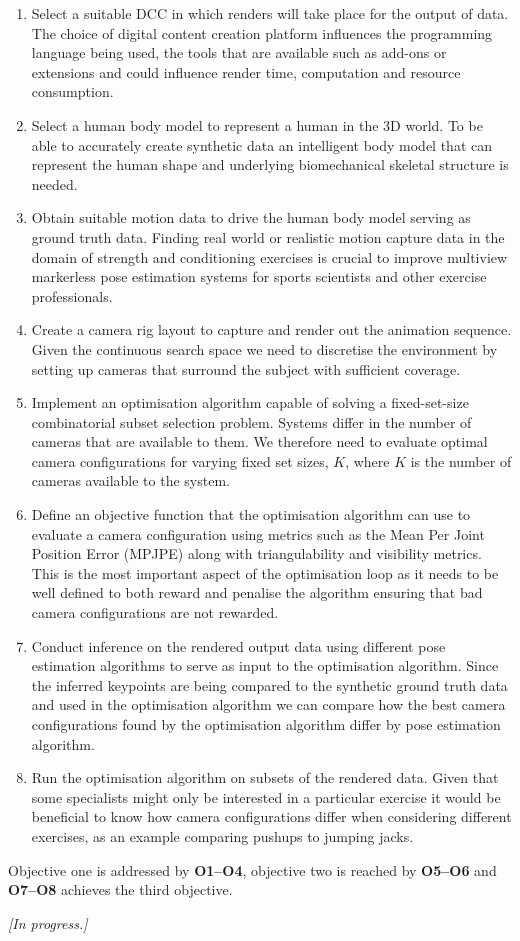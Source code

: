 \begin{enumerate}[label=O\arabic*.]
    \item Select a suitable DCC in which renders will take place for the output of data. The choice of digital content creation platform influences the programming language being used, the tools that are available such as add-ons or extensions and could influence render time, computation and resource consumption. 
    
    \item Select a human body model to represent a human in the 3D world. To be able to accurately create synthetic data an intelligent body model that can represent the human shape and underlying biomechanical skeletal structure is needed.
    
    \item Obtain suitable motion data to drive the human body model serving as ground truth data. Finding real world or realistic motion capture data in the domain of strength and conditioning exercises is crucial to improve multiview markerless pose estimation systems for sports scientists and other exercise professionals.
    
    \item Create a camera rig layout to capture and render out the animation sequence. Given the continuous search space we need to discretise the environment by setting up cameras that surround the subject with sufficient coverage. 
    
    \item Implement an optimisation algorithm capable of solving a fixed-set-size combinatorial subset selection problem. Systems differ in the number of cameras that are available to them. We therefore need to evaluate optimal camera configurations for varying fixed set sizes, $K$, where $K$ is the number of cameras available to the system.    
    
    \item Define an objective function that the optimisation algorithm can use to evaluate a camera configuration using metrics such as the Mean Per Joint Position Error (MPJPE) along with triangulability and visibility metrics. This is the most important aspect of the optimisation loop as it needs to be well defined to both reward and penalise the algorithm ensuring that bad camera configurations are not rewarded.
    
    \item Conduct inference on the rendered output data using different pose estimation algorithms to serve as input to the optimisation algorithm. Since the inferred keypoints are being compared to the synthetic ground truth data and used in the optimisation algorithm we can compare how the best camera configurations found by the optimisation algorithm differ by pose estimation algorithm. 
    
    \item Run the optimisation algorithm on subsets of the rendered data. Given that some specialists might only be interested in a particular exercise it would be beneficial to know how camera configurations differ when considering different exercises, as an example comparing pushups to jumping jacks.
\end{enumerate}

Objective one is addressed by \textbf{O1--O4}, objective two is reached by \textbf{O5--O6} and \textbf{O7--O8} achieves the third objective.

\textit{[In progress.]}

